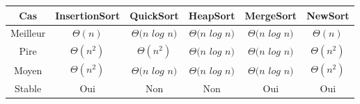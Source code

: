 \documentclass[a4paper, 11pt, oneside]{article}
\begin{document}
\begin{table}[htb]
\begin{tabular}{cccccc}
\hline

Cas   & InsertionSort & QuickSort & HeapSort & MergeSort & NewSort \\ \hline
Meilleur & $\Theta(n)$      & $\Theta(n$ $log$ $n)$   & $\Theta(n$ $log$ $n)$        & $\Theta(n$ $log$ $n)$          & $\Theta(n)$        \\
Pire & $\Theta(n^{2})$     & $\Theta(n^{2})$  & $\Theta(n$ $log$ $n)$         & $\Theta(n$ $log$ $n)$ & $\Theta(n^{2})$       \\
Moyen & $\Theta(n^{2})$      & $\Theta(n$ $log$ $n)$  & $\Theta(n$ $log$ $n)$         & $\Theta(n$ $log$ $n)$         & $\Theta(n^{2})$        \\
Stable & Oui      & Non  & Non         & Oui          & Oui        \\
  
\end{tabular}
\end{table}
\end{document}
